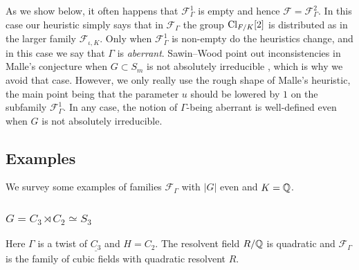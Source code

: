 \documentclass[11pt,a4paper]{amsart}
\def\Q{{\rm \mathbb{Q}}}
\def\Cl{{\rm Cl}}
\numberwithin{equation}{section}
\begin{document}
As we show below, it often happens that $\mathcal{F}_\Gamma^1$ is empty and hence $\mathcal{F} = \mathcal{F}_\Gamma^2$. In this case our heuristic simply says that in $\mathcal{F}_\Gamma$ the group $\Cl_{F/K}[2]$ is distributed as in the larger family $\mathcal{F}_{\iota, K}$. Only when $\mathcal{F}_\Gamma^1$ is non-empty do the heuristics change, and in this case we say that $\Gamma$ is {\it aberrant}.  Sawin--Wood point out inconsistencies in Malle's conjecture when $G \subset S_m$ is not absolutely irreducible \cite[\S12.3.2]{SawinWood}, which is why we avoid that case. However, we only really use the rough shape of Malle's heuristic, the main point being that the parameter $u$ should be lowered by $1$ on the subfamily $\mathcal{F}_\Gamma^1$. In any case, the notion of $\Gamma$-being aberrant is well-defined even when $G$ is not absolutely irreducible.  


\subsection{Examples} \label{subsec: Gamma-extensions heuristics examples}
We survey some examples of families $\mathcal{F}_\Gamma$ with $|G|$ even and $K = \Q$.    
\subsubsection{$G = C_3 \rtimes C_2 \simeq S_3$}
Here $\Gamma$ is a twist of $\underline{C_3}$ and $H =C_2$. The resolvent field $R/\Q$ is quadratic and $\mathcal{F}_\Gamma$ is the family of cubic fields with quadratic resolvent $R$. 
\end{document}
